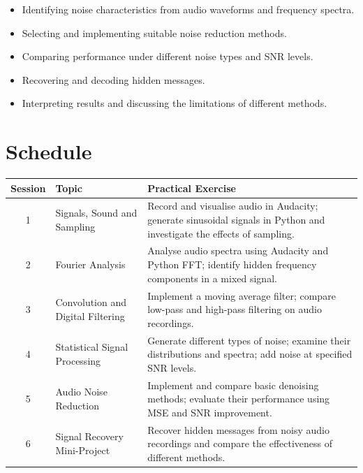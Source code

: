 \documentclass[12pt,fontset=none]{ctexart}
\begin{document}
\begin{itemize}
  \item Identifying noise characteristics from
  audio waveforms and frequency spectra.
  \item Selecting and implementing suitable
  noise reduction methods.
  \item Comparing performance under different
  noise types and SNR levels.
  \item Recovering and decoding hidden messages.
  \item Interpreting results and discussing
  the limitations of different methods.
\end{itemize}

\section{Schedule}

\begin{center}
\small
\begin{tabular}{@{}c p{4cm} p{10.8cm}@{}}
\toprule
Session & Topic & Practical Exercise \\
\midrule

1 & Signals, Sound and Sampling
  & Record and visualise audio in Audacity;
    generate sinusoidal signals in Python
    and investigate the effects of sampling. \\

2 & Fourier Analysis
  & Analyse audio spectra using Audacity
    and Python FFT; identify hidden frequency
    components in a mixed signal. \\

3 & Convolution and Digital Filtering
  & Implement a moving average filter;
    compare low-pass and high-pass filtering
    on audio recordings. \\

4 & Statistical Signal Processing
  & Generate different types of noise;
    examine their distributions and spectra;
    add noise at specified SNR levels. \\

5 & Audio Noise Reduction
  & Implement and compare basic denoising
    methods; evaluate their performance
    using MSE and SNR improvement. \\

6 & Signal Recovery Mini-Project
  & Recover hidden messages from noisy
    audio recordings and compare the
    effectiveness of different methods. \\

\bottomrule
\end{tabular}
\end{center}
\end{document}
